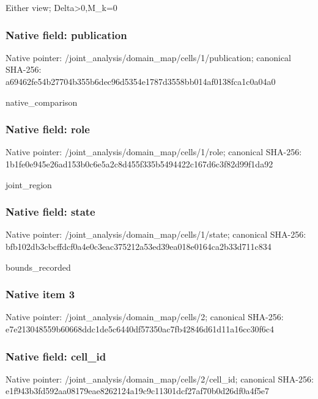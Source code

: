 \documentclass[10pt,a4paper]{article}
\begin{document}
\begingroup\raggedright\sloppy Either view;\allowbreak{} Delta>0,\allowbreak{}M\_\allowbreak{}k=\allowbreak{}0\par\endgroup

\subsubsection{Native field: publication}
Native pointer: /joint\_\allowbreak{}analysis/domain\_\allowbreak{}map/cells/1/publication; canonical SHA-256: a69462fe54b27704b355b6dec96d5354e1787d3558bb014af0138fca1c0a04a0

\begingroup\raggedright\sloppy native\_\allowbreak{}comparison\par\endgroup

\subsubsection{Native field: role}
Native pointer: /joint\_\allowbreak{}analysis/domain\_\allowbreak{}map/cells/1/role; canonical SHA-256: 1b1fe0e945e26ad153b0c6e5a2c8d455f335b5494422c167d6c3f82d99f1da92

\begingroup\raggedright\sloppy joint\_\allowbreak{}region\par\endgroup

\subsubsection{Native field: state}
Native pointer: /joint\_\allowbreak{}analysis/domain\_\allowbreak{}map/cells/1/state; canonical SHA-256: bfb102db3cbcffdcf0a4e0c3eac375212a53ed39ea018e0164ca2b33d711c834

\begingroup\raggedright\sloppy bounds\_\allowbreak{}recorded\par\endgroup

\subsubsection{Native item 3}
Native pointer: /joint\_\allowbreak{}analysis/domain\_\allowbreak{}map/cells/2; canonical SHA-256: e7e213048559b60668ddc1de5c6440df57350ac7fb42846d61d11a16cc30f6c4

\subsubsection{Native field: cell\_\allowbreak{}id}
Native pointer: /joint\_\allowbreak{}analysis/domain\_\allowbreak{}map/cells/2/cell\_\allowbreak{}id; canonical SHA-256: e1f943b3fd592aa08179eae8262124a19c9c11301dcf27af70b0d26df0a4f5e7
\end{document}

